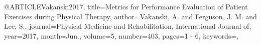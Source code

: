 @ARTICLE{Vakanski2017,
title={Metrics for Performance Evaluation of Patient Exercises during Physical Therapy},
author={Vakanski, A. and Ferguson, J. M. and Lee, S.},
journal={Physical Medicine and Rehabilitation, International Journal of}, 
year={2017},
month={Jun.},
volume={5},
number={403},
pages={1 - 6},
keywords={},
}
